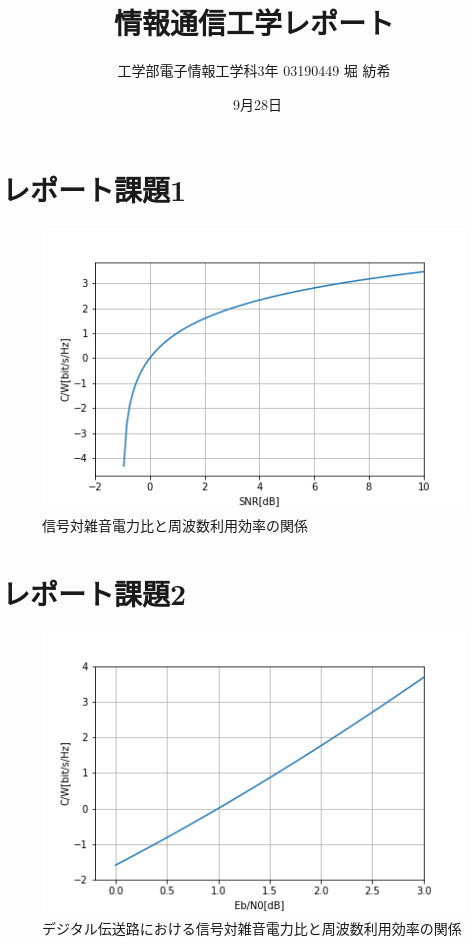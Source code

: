 \documentclass[dvipdfmx]{jsarticle}
\begin{document}
\title{情報通信工学レポート}
\author{工学部電子情報工学科3年 03190449  堀 紡希}
\date{\ 9月28日}
\maketitle

\section{レポート課題1}


\begin{figure}[H]
\includegraphics[scale = 0.8]{1.png}
\caption{信号対雑音電力比と周波数利用効率の関係}
\end{figure}

\section{レポート課題2}


\begin{figure}[H]
\includegraphics[scale = 0.8]{2.png}
\caption{デジタル伝送路における信号対雑音電力比と周波数利用効率の関係}
\end{figure}
\end{document}
